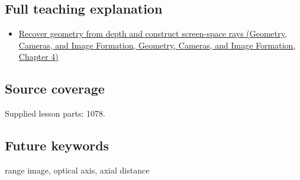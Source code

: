 \subsection{Full teaching explanation}\label{appendix-cac01ebeeb11-full-teaching-explanation}

\begin{itemize}
\tightlist
\item
  \href{../03-Geometry-Cameras-and-Image-Formation/main.pdf\#nameddest=02-foundations-ii-ch035-recover-geometry-from-depth-and-construct-screen-space-rays}{Recover geometry from depth and construct screen-space rays (Geometry, Cameras, and Image Formation, Geometry, Cameras, and Image Formation, Chapter 4)}
\end{itemize}

\subsection{Source coverage}\label{appendix-cac01ebeeb11-source-coverage}

Supplied lesson parts: 1078.

\subsection{Future keywords}\label{appendix-cac01ebeeb11-future-keywords}

range image, optical axis, axial distance
